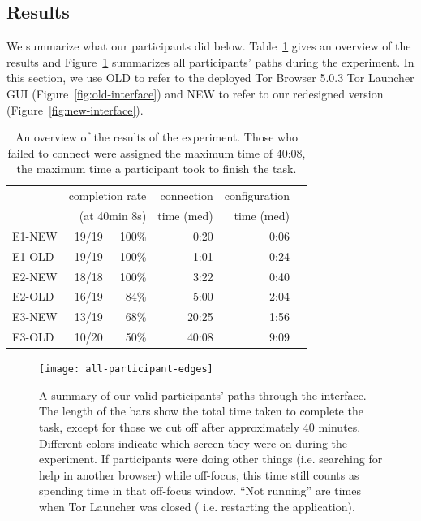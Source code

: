 \documentclass[USenglish,oneside,twocolumn]{article}
\begin{document}
\subsection{Results} 
We summarize what our participants did below.  Table~\ref{table:participant-summary} gives an overview of the results and Figure~\ref{fig:all-participant-edges} summarizes all participants' paths during the experiment. In this section, we use OLD to refer to the deployed Tor Browser 5.0.3 Tor Launcher GUI (Figure~\ref{fig:old-interface}) and NEW to refer to our redesigned version (Figure~\ref{fig:new-interface}).

\begin{table}[t]
\centering
\begin{tabular}{l r r r r r}
& \multicolumn{2}{r}{completion rate} & \multicolumn{1}{r}{connection} & \multicolumn{1}{r}{configuration} \\
& \multicolumn{2}{r}{(at 40min 8s)} & \multicolumn{1}{r}{time (med)} & \multicolumn{1}{r}{time (med)} \\
\noalign{\hrule}
E1-NEW & 19/19 & 100\% & 0:20 & 0:06 \\
E1-OLD & 19/19 & 100\% & 1:01 & 0:24 \\
E2-NEW & 18/18 & 100\% & 3:22 & 0:40 \\
E2-OLD & 16/19 & 84\% & 5:00 & 2:04 \\
E3-NEW & 13/19 & 68\% & 20:25 & 1:56 \\
E3-OLD & 10/20 & 50\% & 40:08 & 9:09 \\
\end{tabular}
\caption{
An overview of the results of the experiment. Those who
failed to connect were assigned the maximum time of 40:08, 
the maximum time a participant took to finish the task.
}
\label{table:participant-summary}
\end{table}

\label{all-participant-edges} 
\begin{figure}
\centering
\texttt{[image: all-participant-edges]}
\caption{
A summary of our valid participants' paths through the interface.
The length of the bars show the total time taken to complete the task,
except for those we cut off after approximately 40 minutes.
Different colors indicate which screen they were on during the experiment.
If participants were doing other things (i.e. searching for help in another browser)
while off-focus, this time still counts as spending time in that off-focus window. 
``Not running'' are times when Tor Launcher was closed (
i.e. restarting the application).}
\label{fig:all-participant-edges}
\end{figure}
\end{document}
